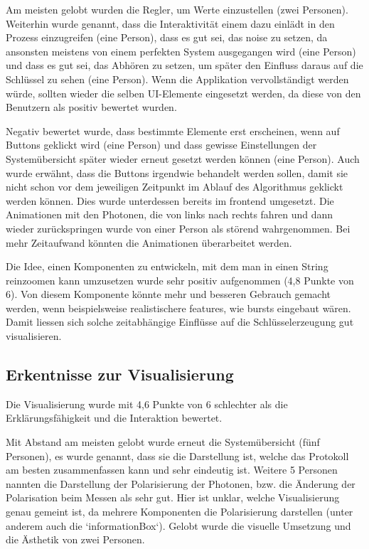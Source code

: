 \documentclass[a4paper,10.2pt,pdftex]{scrartcl}%
\begin{document}
Am meisten gelobt wurden die Regler, um Werte einzustellen (zwei Personen). Weiterhin wurde genannt, dass die Interaktivität einem dazu einlädt in den Prozess einzugreifen (eine Person), dass es gut sei, das noise zu setzen, da ansonsten meistens von einem perfekten System ausgegangen wird (eine Person) und dass es gut sei, das Abhören zu setzen, um später den Einfluss daraus auf die Schlüssel zu sehen (eine Person). Wenn die Applikation vervollständigt werden würde, sollten wieder die selben UI-Elemente eingesetzt werden, da diese von den Benutzern als positiv bewertet wurden.

Negativ bewertet wurde, dass bestimmte Elemente erst erscheinen, wenn auf Buttons geklickt wird (eine Person) und dass gewisse Einstellungen der Systemübersicht später wieder erneut gesetzt werden können (eine Person). Auch wurde erwähnt, dass die Buttons irgendwie behandelt werden sollen, damit sie nicht schon vor dem jeweiligen Zeitpunkt im Ablauf des Algorithmus geklickt werden können. Dies wurde unterdessen bereits im frontend umgesetzt. Die Animationen mit den Photonen, die von links nach rechts fahren und dann wieder zurückspringen wurde von einer Person als störend wahrgenommen. Bei mehr Zeitaufwand könnten die Animationen überarbeitet werden.

Die Idee, einen Komponenten zu entwickeln, mit dem man in einen String reinzoomen kann umzusetzen wurde sehr positiv aufgenommen (4,8 Punkte von 6). Von diesem Komponente könnte mehr und besseren Gebrauch gemacht werden, wenn beispielsweise realistischere features, wie bursts eingebaut wären. Damit liessen sich solche zeitabhängige Einflüsse auf die Schlüsselerzeugung gut visualisieren.
\subsection{Erkentnisse zur Visualisierung}
Die Visualisierung wurde mit 4,6 Punkte von 6 schlechter als die Erklärungsfähigkeit und die Interaktion bewertet.

Mit Abstand am meisten gelobt wurde erneut die Systemübersicht (fünf Personen), es wurde genannt, dass sie die Darstellung ist, welche das Protokoll am besten zusammenfassen kann und sehr eindeutig ist. Weitere 5 Personen nannten die Darstellung der Polarisierung der Photonen, bzw. die Änderung der Polarisation beim Messen als sehr gut. Hier ist unklar, welche Visualisierung genau gemeint ist, da mehrere Komponenten die Polarisierung darstellen (unter anderem auch die `informationBox`). Gelobt wurde die visuelle Umsetzung und die Ästhetik von zwei Personen.
\end{document}
